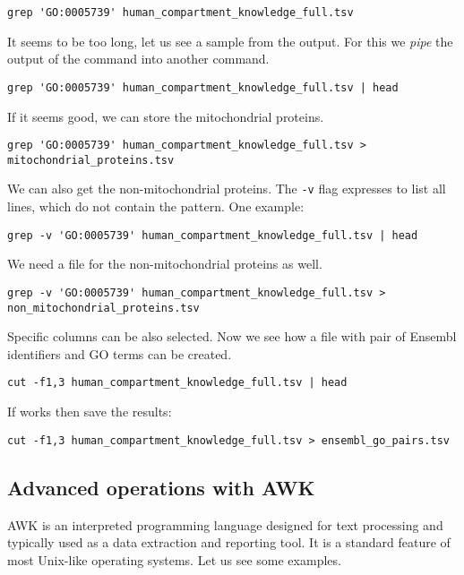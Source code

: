 \documentclass{article}\usepackage[]{graphicx}\usepackage[usenames,dvipsnames]{color}
\begin{document}
\begin{verbatim}
grep 'GO:0005739' human_compartment_knowledge_full.tsv
\end{verbatim}

It seems to be too long, let us see a sample from the output. For this we \emph{pipe} the output of the command into another command.

\begin{verbatim}
grep 'GO:0005739' human_compartment_knowledge_full.tsv | head
\end{verbatim}

If it seems good, we can store the mitochondrial proteins.

\begin{verbatim}
grep 'GO:0005739' human_compartment_knowledge_full.tsv > mitochondrial_proteins.tsv
\end{verbatim}

We can also get the non-mitochondrial proteins. The \verb+-v+ flag expresses to list all lines, which do not contain the pattern. One example:

\begin{verbatim}
grep -v 'GO:0005739' human_compartment_knowledge_full.tsv | head
\end{verbatim}

We need a file for the non-mitochondrial proteins as well.

\begin{verbatim}
grep -v 'GO:0005739' human_compartment_knowledge_full.tsv > non_mitochondrial_proteins.tsv
\end{verbatim}

Specific columns can be also selected. Now we see how a file with pair of Ensembl identifiers and GO terms can be created.

\begin{verbatim}
cut -f1,3 human_compartment_knowledge_full.tsv | head
\end{verbatim}

If works then save the results:

\begin{verbatim}
cut -f1,3 human_compartment_knowledge_full.tsv > ensembl_go_pairs.tsv
\end{verbatim}

\subsection{Advanced operations with AWK}

AWK is an interpreted programming language designed for text processing and typically used as a data extraction and reporting tool. It is a standard feature of most Unix-like operating systems. Let us see some examples.
\end{document}
